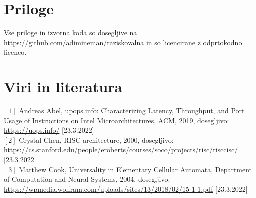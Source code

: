 \documentclass[12pt]{article}
\begin{document}
\section{Priloge}

Vse priloge in izvorna koda so dosegljive na \url{https://github.com/adimineman/raziskovalna} in so licencirane z odprtokodno licenco.

\lstset{
  basicstyle=\footnotesize,
  breaklines=true,
  frame=single,
  stepnumber=5,
}









%



\pagebreak
\section{Viri in literatura}
$[1]$ Andreas Abel, upops.info: Characterizing Latency, Throughput, and Port Usage of Instructions on Intel Microarchitectures, ACM, 2019, dosegljivo: \url{https://uops.info/} [23.3.2022]\\
$[2]$ Crystal Chen, RISC architecture, 2000, dosegljivo: \url{https://cs.stanford.edu/people/eroberts/courses/soco/projects/risc/risccisc/} [23.3.2022]\\
$[3]$ Matthew Cook, Universality in Elementary Cellular Automata, Department of Computation and Neural Systems, 2004, dosegljivo: \url{https://wpmedia.wolfram.com/uploads/sites/13/2018/02/15-1-1.pdf} [23.3.2022]\\

\end{document}
